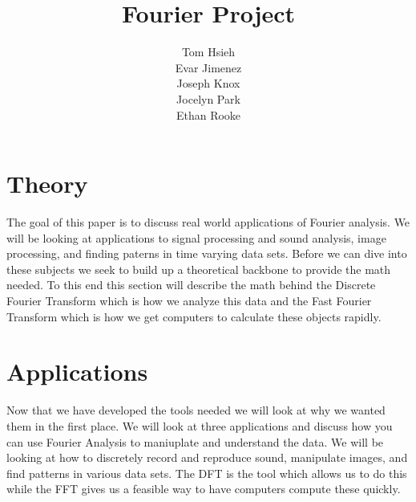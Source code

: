 \documentclass[11pt]{report}
\title{Fourier Project}
\author{Tom Hsieh\\
        Evar Jimenez\\
        Joseph Knox\\
        Jocelyn Park \\
        Ethan Rooke }
\begin{document}
\maketitle

\tableofcontents

\chapter{Theory}
  The goal of this paper is to discuss real world applications
  of Fourier analysis. We will be looking at applications to
  signal processing and sound analysis, image processing, and
  finding paterns in time varying data sets. Before we can
  dive into these subjects we seek to build up a theoretical
  backbone to provide the math needed. To this end this
  section will describe the math behind the Discrete Fourier Transform
  which is how we analyze this data and the Fast Fourier Transform
  which is how we get computers to calculate these objects rapidly.
  
  \newpage
  
  \newpage
\chapter{Applications}
  Now that we have developed the tools needed we will look at
  why we wanted them in the first place. We will look at three
  applications and discuss how you can use Fourier Analysis to
  maniuplate and understand the data. We will be looking at how
  to discretely record and reproduce sound, manipulate images,
  and find patterns in various data sets. The DFT is the tool
  which allows us to do this while the FFT gives us a feasible
  way to have computers compute these quickly.
  
  \newpage
  
  \newpage
  

  \nocite{*} %
  \printbibliography
\end{document}
